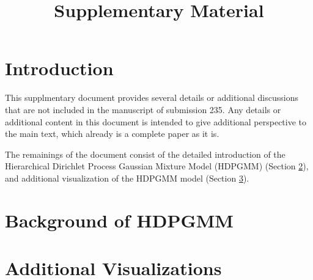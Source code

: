 \documentclass{article}
\title{Supplementary Material}
\begin{document}
\maketitle

\section{Introduction}\label{sec:introduction}

This supplmentary document provides several details or additional discussions that are not included in the manuscript of submission 235. Any details or additional content in this document is intended to give additional perspective to the main text, which already is a complete paper as it is.

The remainings of the document consist of the detailed introduction of the Hierarchical Dirichlet Process Gaussian Mixture Model (HDPGMM) (Section \ref{sec:hdpgmm}), and additional visualization of the HDPGMM model (Section \ref{sec:visualization}).

\section{Background of HDPGMM}\label{sec:hdpgmm}

\section{Additional Visualizations}\label{sec:visualization}



% 
\end{document}
